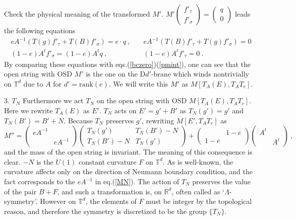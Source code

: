 \documentclass[a4paper,12pt]{article}
\newcommand{\R}{{\mathbb{R}}}
\newcommand{\T}{{\mathbb{T}}}
\newcommand{\bp}{\begin{pmatrix}}
\newcommand{\ep}{\end{pmatrix}}
\def \rank{\mathrm{rank}}
\begin{document}
Check the physical meaning of the transformed $M'$. 
\begin{math}
 M'\bp f'_\tau\\ f'_\sigma\ep=\bp q \\ 0\ep
\end{math} 
leads the following equations
\begin{equation*}
 \begin{split}
  eA^{-1} (T(g)f'_\tau +T(B)f'_\sigma)=e\cdot q\ ,&\quad
  e A^{-1} (T(B)f'_\tau +T(g)f'_\sigma)= 0 \\
  (1-e)A^t f'_\sigma=(1-e)A^t q\ ,&\quad
  (1-e)A^tf'_\tau=0\ .
 \end{split}
\end{equation*}
By comparing these equations with eqs.(\ref{bczero})(\ref{pmint}), 
one can see that the open string with OSD $M'$ is 
the one on the D$d'$-brane which winds nontrivially on $\T^d$ due to $A$ 
for $d'=\rank (e)$. We will write this $M'$ as $M[T_A(E),T_AT_e]$.


3. $T_N$ \quad Furthermore we act $T_N$ on the open string with OSD 
$M[T_A(E),T_AT_e]$. Here we rewrite $T_A(E)$ as $E'$. $T_N$ acts 
on $E'=g'+B'$ as $T_N(g')=g'$ and $T_N(B')=B'+N$. 
Because $T_N$ preserves $g'$, rewriting $M[E',T_AT_e]$ as 
\begin{equation}
 M''=\bp e A^{-1}& \\ &e A^{-1}\ep
 \bp T_N(g')&T_N(B')-N\\ T_N(B')-N&T_N(g')\ep
 +\bp & 1-e\\ 1-e & \ep \bp A^t& \\ &A^t\ep\ , \label{MN}
\end{equation}
and the mass of the open string is invariant. 
The meaning of this consequence is clear. $-N$ is the $U(1)$ 
constant curvature $F$ on $\T^d$. As is well-known, 
the curvature affects only on the direction of Neumann boundary condition, 
and the fact corresponds to the $eA^{-1}$ in eq.(\ref{MN}). 
The action of $T_N$ preserves the value of the pair $B+F$, and such a 
transformation is, on $\R^d$, often called as `$\Lambda$-symmetry'. 
However on $\T^d$, the elements of $F$ must be integer 
by the topological reason, and therefore the symmetry is discretized to 
be the group $\{T_N\}$. 

\vspace*{0.3cm}
\end{document}
